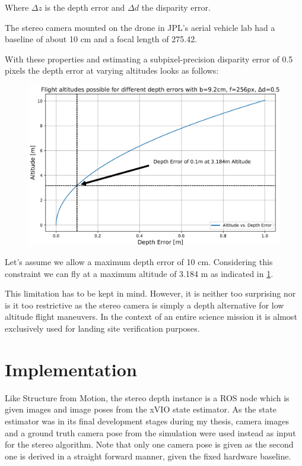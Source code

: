 Where $\Delta z$ is the depth error and $\Delta d$ the disparity error.

The stereo camera mounted on the drone in JPL's aerial vehicle lab had a baseline of about 10 cm and a focal length of 275.42.

With these properties and estimating a subpixel-precision disparity error of 0.5 pixels the depth error at varying altitudes looks as follows:

\begin{figure}
    \centering
    \includegraphics[scale=0.24]{images/stereo_camera_depth/stereo_limit.png}
    \label{fig:stereo_limit}
\end{figure}

Let's assume we allow a maximum depth error of 10 cm. Considering this constraint we can fly at a maximum altitude of 3.184 m as indicated in \cref{fig:stereo_limit}.

This limitation has to be kept in mind. However, it is neither too surprising nor is it too restrictive as the stereo camera is simply a depth alternative for low altitude flight maneuvers. In the context of an entire science mission it is almost exclusively used for landing site verification purposes.

\section{Implementation}

Like Structure from Motion, the stereo depth instance is a ROS node which is given images and image poses from the xVIO state estimator. As the state estimator was in its final development stages during my thesis, camera images and a ground truth camera pose from the simulation were used instead as input for the stereo algorithm. Note that only one camera pose is given as the second one is derived in a straight forward manner, given the fixed hardware baseline.

